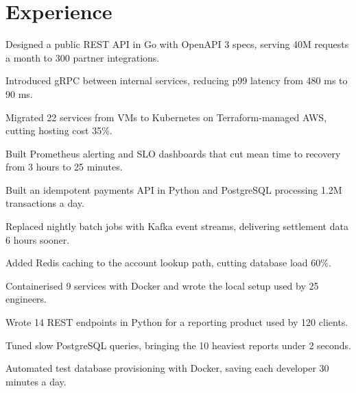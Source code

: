 \documentclass[]{deedy-resume-openfont}
\begin{document}
\begin{minipage}[t]{0.66\textwidth}

\section{Experience}
\vspace{\topsep} %
\begin{tightemize}
\item Designed a public REST API in Go with OpenAPI 3 specs, serving 40M requests a month to 300 partner integrations. %
\item Introduced gRPC between internal services, reducing p99 latency from 480 ms to 90 ms. %
\item Migrated 22 services from VMs to Kubernetes on Terraform-managed AWS, cutting hosting cost 35\%. %
\item Built Prometheus alerting and SLO dashboards that cut mean time to recovery from 3 hours to 25 minutes. %
\end{tightemize}
\sectionsep
{}
\vspace{\topsep} %
\begin{tightemize}
\item Built an idempotent payments API in Python and PostgreSQL processing 1.2M transactions a day. %
\item Replaced nightly batch jobs with Kafka event streams, delivering settlement data 6 hours sooner. %
\item Added Redis caching to the account lookup path, cutting database load 60\%. %
\item Containerised 9 services with Docker and wrote the local setup used by 25 engineers. %
\end{tightemize}
\sectionsep
{}
\vspace{\topsep} %
\begin{tightemize}
\item Wrote 14 REST endpoints in Python for a reporting product used by 120 clients. %
\item Tuned slow PostgreSQL queries, bringing the 10 heaviest reports under 2 seconds. %
\item Automated test database provisioning with Docker, saving each developer 30 minutes a day. %
\end{tightemize}
\sectionsep


\end{minipage}
\end{document}
